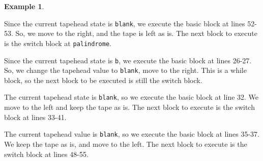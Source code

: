 \documentclass{amsart}
\theoremstyle{definition}
\newtheorem{example}[rules]{Example}
\begin{document}
\begin{example}
\begin{figure}[H]
    \end{figure}
    \noindent Since the current tapehead state is \texttt{blank}, we execute the basic block at lines 52-53. So, we move to the right, and the tape is left as is. The next block to execute is the switch block at \texttt{palindrome}.
    \begin{figure}[H]
        \centering
    \end{figure}
    \noindent Since the current tapehead state is \texttt{b}, we execute the basic block at lines 26-27. So, we change the tapehead value to \texttt{blank}, move to the right. This is a while block, so the next block to be executed is still the switch block.
    \begin{figure}[H]
        \centering
    \end{figure}
    \noindent The current tapehead state is \texttt{blank}, so we execute the basic block at line 32. We move to the left and keep the tape as is. The next block to execute is the switch block at lines 33-41.
    \begin{figure}[H]
        \centering
    \end{figure}
    \noindent The current tapehead value is \texttt{blank}, so we execute the basic block at lines 35-37. We keep the tape as is, and move to the left. The next block to execute is the switch block at lines 48-55.
    \begin{figure}[H]
        \centering
\end{figure}
\end{example}
\end{document}

